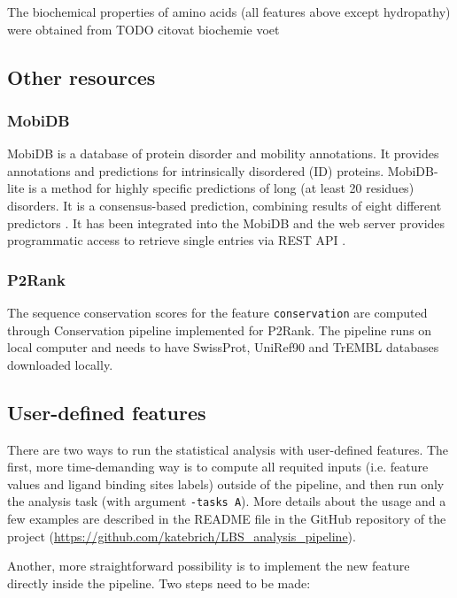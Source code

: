The biochemical properties of amino acids (all features above except hydropathy) were obtained from TODO citovat biochemie voet

\subsection{Other resources}

\subsubsection{MobiDB}

MobiDB is a database of protein disorder and mobility annotations. It provides annotations and predictions for intrinsically disordered (ID) proteins. MobiDB-lite is a method for highly specific predictions of long (at least 20 residues) disorders. It is a consensus-based prediction, combining results of eight different predictors
\cite{mobidb}. It has been integrated into the MobiDB and the web server provides programmatic access to retrieve single entries via REST API \cite{mobidbApi}.

\subsubsection{P2Rank}

The sequence conservation scores for the feature \texttt{conservation} are computed through Conservation pipeline \cite{conservation} implemented for P2Rank. The pipeline runs on local computer and needs to have SwissProt, UniRef90 and TrEMBL databases downloaded locally.

\subsection{User-defined features}

There are two ways to run the statistical analysis with user-defined features. The first, more time-demanding way is to compute all requited inputs (i.e. feature values and ligand binding sites labels) outside of the pipeline, and then run only the analysis task (with argument \texttt{-tasks A}). More details about the usage and a few  examples are described in the README file in the GitHub repository of the project (\url{https://github.com/katebrich/LBS_analysis_pipeline}).

Another, more straightforward possibility is to implement the new feature directly inside the pipeline. Two steps need to be made:


